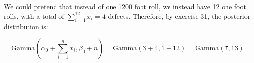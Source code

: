 \documentclass[a4paper]{article}
\begin{document}
                We could pretend that instead of one 1200 foot roll, we instead
                have 12 one foot rolls, with a total of $\sum\limits_{i=1}^{12}
                x_i = 4$ defects. Therefore, by exercise 31, the posterior
                distribution is:

                \[
                    \text{Gamma}\left(\alpha_0 + \sum\limits_{i=1}^{n} x_i,
                    \beta_0 + n\right) = \text{Gamma}(3 + 4, 1 + 12) =
                    \text{Gamma}(7, 13)
                \]
\end{document}
